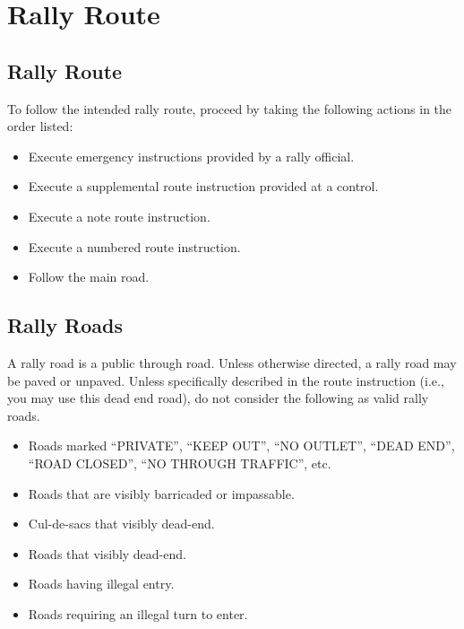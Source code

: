 \section{Rally Route}

\subsection{Rally Route}
To follow the intended rally route, proceed by taking the following actions in the order listed:

\begin{itemize}

\item Execute emergency instructions provided by a rally official.

\item Execute a supplemental route instruction provided at a control.

\item Execute a note route instruction.

\item Execute a numbered route instruction.

\item Follow the main road.

\end{itemize}

\subsection{Rally Roads}
A rally road is a public through road.  Unless otherwise directed, a rally road may be paved or unpaved.  Unless specifically described in the route instruction (i.e., you may use this dead end road), do not consider the following as valid rally roads.

\begin{itemize}

\item Roads marked ``PRIVATE'', ``KEEP OUT'', ``NO OUTLET'', ``DEAD END'', ``ROAD CLOSED'', ``NO THROUGH TRAFFIC'', etc.

\item Roads that are visibly barricaded or impassable.

\item Cul-de-sacs that visibly dead-end.

\item Roads that visibly dead-end.

\item Roads having illegal entry.

\item Roads requiring an illegal turn to enter.

\end{itemize}

